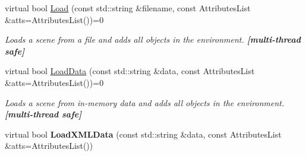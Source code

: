 \begin{DoxyCompactItemize}
\item 
\hypertarget{classOpenRAVE_1_1EnvironmentBase_a0937ee944308cece16c98c035c40eb7c}{
virtual bool \hyperlink{classOpenRAVE_1_1EnvironmentBase_a0937ee944308cece16c98c035c40eb7c}{Load} (const std::string \&filename, const AttributesList \&atts=AttributesList())=0}
\label{classOpenRAVE_1_1EnvironmentBase_a0937ee944308cece16c98c035c40eb7c}

\begin{DoxyCompactList}\small\item\em Loads a scene from a file and adds all objects in the environment. {\bfseries \mbox{[}multi-\/thread safe\mbox{]}} \item\end{DoxyCompactList}\item 
\hypertarget{classOpenRAVE_1_1EnvironmentBase_a0b1bc7ab475bb5cb1b1d7d0fb3c77b5d}{
virtual bool \hyperlink{classOpenRAVE_1_1EnvironmentBase_a0b1bc7ab475bb5cb1b1d7d0fb3c77b5d}{LoadData} (const std::string \&data, const AttributesList \&atts=AttributesList())=0}
\label{classOpenRAVE_1_1EnvironmentBase_a0b1bc7ab475bb5cb1b1d7d0fb3c77b5d}

\begin{DoxyCompactList}\small\item\em Loads a scene from in-\/memory data and adds all objects in the environment. {\bfseries \mbox{[}multi-\/thread safe\mbox{]}} \item\end{DoxyCompactList}\item 
\hypertarget{classOpenRAVE_1_1EnvironmentBase_a41363bcb26f68d8d25a0f3270558219e}{
virtual bool {\bfseries LoadXMLData} (const std::string \&data, const AttributesList \&atts=AttributesList())}
\label{classOpenRAVE_1_1EnvironmentBase_a41363bcb26f68d8d25a0f3270558219e}


\end{DoxyCompactItemize}
